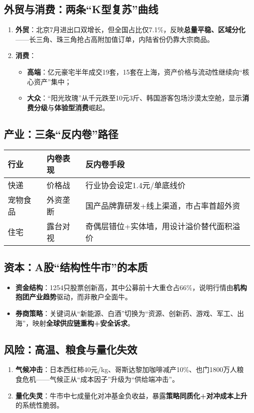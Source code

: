 \subsection{外贸与消费：两条“K型复苏”曲线}
\begin{enumerate}
  \item \textbf{外贸}：北京7月进出口双增长，但全国占比仅7.1\%，反映\textbf{总量平稳、区域分化}——长三角、珠三角抢占高附加值订单，内陆省份仍靠大宗商品。
  \item \textbf{消费}：  
  \begin{itemize}
    \item \textbf{高端}：亿元豪宅半年成交19套，15套在上海，资产价格与流动性继续向“核心资产”集中；  
    \item \textbf{大众}：“阳光玫瑰”从千元跌至10元3斤、韩国游客包场沙漠太空舱，显示\textbf{消费分级}与\textbf{体验型消费}崛起。
  \end{itemize}
\end{enumerate}

\subsection{产业：三条“反内卷”路径}
\begin{table}[h]
\centering
\begin{tabular}{@{}lll@{}}
\toprule
行业 & 内卷表现 & 反内卷手段 \\ \midrule
快递 & 价格战 & 行业协会设定1.4元/单底线价 \\
宠物食品 & 外资垄断 & 国产品牌靠研发+线上渠道，市占率首超外资 \\
住宅 & 露台对视 & 奇偶层错位+实体墙，用设计溢价替代面积溢价 \\ \bottomrule
\end{tabular}
\end{table}

\subsection{资本：A股“结构性牛市”的本质}
\begin{itemize}
  \item \textbf{资金结构}：1254只股票创新高，其中公募前十大重仓占66\%，说明行情由\textbf{机构抱团产业趋势}驱动，而非散户全面牛。
  \item \textbf{券商策略}：关键词从“新能源、白酒”切换为“资源、创新药、游戏、军工、出海”，映射\textbf{全球供应链重构+安全诉求}。
\end{itemize}

\subsection{风险：高温、粮食与量化失效}
\begin{enumerate}
  \item \textbf{气候冲击}：日本西红柿40元/kg、哥斯达黎加咖啡减产10\%、也门1800万人粮食危机——气候正从“成本因子”升级为“供给端冲击”。
  \item \textbf{量化失灵}：牛市中七成量化对冲基金负收益，暴露\textbf{策略同质化+对冲成本上升}的系统性脆弱。
\end{enumerate}

